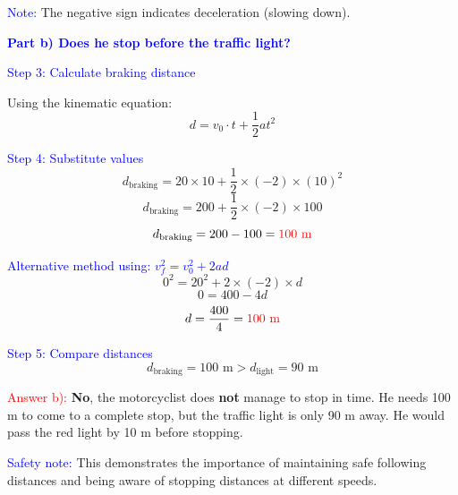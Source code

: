 \begin{exercise}
\begin{solu}
        \textcolor{blue}{Note:} The negative sign indicates deceleration (slowing down).

        \vspace{0.5cm}

        \textbf{\textcolor{blue}{Part b) Does he stop before the traffic light?}}

        \textcolor{blue}{Step 3: Calculate braking distance}

        Using the kinematic equation:
        \[
            \boxed{d = v_0 \cdot t + \frac{1}{2} a t^2}
        \]

        \textcolor{blue}{Step 4: Substitute values}
        \[
            d_{\text{braking}} = 20 \times 10 + \frac{1}{2} \times (-2) \times (10)^2
        \]
        \[
            d_{\text{braking}} = 200 + \frac{1}{2} \times (-2) \times 100
        \]
        \[
            d_{\text{braking}} = 200 - 100 = \textcolor{red}{100 \text{ m}}
        \]

        \textcolor{blue}{Alternative method using: $v_f^2 = v_0^2 + 2ad$}
        \[
            0^2 = 20^2 + 2 \times (-2) \times d
        \]
        \[
            0 = 400 - 4d
        \]
        \[
            d = \frac{400}{4} = \textcolor{red}{100 \text{ m}}
        \]

        \textcolor{blue}{Step 5: Compare distances}
        \[
            d_{\text{braking}} = 100 \text{ m} > d_{\text{light}} = 90 \text{ m}
        \]

        \textcolor{red}{Answer b):} \textbf{No}, the motorcyclist does \textbf{not} manage to stop in time. He needs 100 m to come to a complete stop, but the traffic light is only 90 m away. He would pass the red light by 10 m before stopping.

        \textcolor{blue}{Safety note:} This demonstrates the importance of maintaining safe following distances and being aware of stopping distances at different speeds.
    \end{solu}
\end{exercise}



